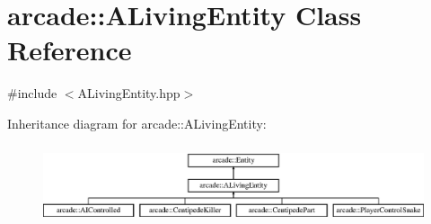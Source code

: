 \hypertarget{classarcade_1_1_a_living_entity}{\section{arcade\-:\-:A\-Living\-Entity Class Reference}
\label{classarcade_1_1_a_living_entity}
}


{\ttfamily \#include $<$A\-Living\-Entity.\-hpp$>$}

Inheritance diagram for arcade\-:\-:A\-Living\-Entity\-:\begin{figure}[H]
\begin{center}
\leavevmode
\includegraphics[height=2.346369cm]{classarcade_1_1_a_living_entity}
\end{center}
\end{figure}
